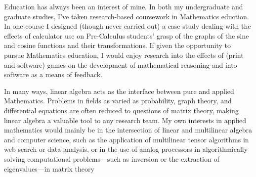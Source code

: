 \documentclass[11pt]{article}
\begin{document}
Education has always been an interest of mine. In both my undergraduate
and graduate studies, I've taken research-based coursework in
Mathematics eduction. In one course I designed
(though never carried out) a case study dealing with the effects of
calculator use on Pre-Calculus students' grasp of the graphs of the sine
and cosine functions and their transformations. If given the opportunity
to pursue Mathematics education, I would enjoy research into the effects
of (print and software) games on the development of mathematical
reasoning and into software as a means of feedback.

In many ways, linear algebra acts as the interface between pure and
applied Mathematics. Problems in fields as varied as probability,
graph theory, and differential equations are often reduced to questions
of matrix theory, making linear algebra a valuable tool to any research
team. My own interests in applied mathematics would mainly be in the
intersection of linear and multilinear algebra and computer science,
such as the application of multilinear tensor algorithms in web search
or data analysis, or in the use of analog processors in algorithmically
solving computational problems---such as inversion or the extraction of
eigenvalues---in matrix theory

\printbibliography[heading=none]

\label{page:last}
\end{document}
